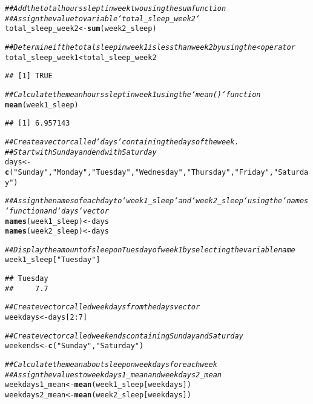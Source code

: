 \documentclass{article}\usepackage[]{graphicx}\usepackage[]{xcolor}
\makeatletter
\newcommand{\hlnum}[1]{\textcolor[rgb]{0.686,0.059,0.569}{#1}}%
\newcommand{\hlstr}[1]{\textcolor[rgb]{0.192,0.494,0.8}{#1}}%
\newcommand{\hlcom}[1]{\textcolor[rgb]{0.678,0.584,0.686}{\textit{#1}}}%
\newcommand{\hlopt}[1]{\textcolor[rgb]{0,0,0}{#1}}%
\newcommand{\hlstd}[1]{\textcolor[rgb]{0.345,0.345,0.345}{#1}}%
\newcommand{\hlkwb}[1]{\textcolor[rgb]{0.69,0.353,0.396}{#1}}%
\newcommand{\hlkwd}[1]{\textcolor[rgb]{0.737,0.353,0.396}{\textbf{#1}}}%
\newenvironment{kframe}{%
 \def\at@end@of@kframe{}%
 \ifinner\ifhmode%
  \def\at@end@of@kframe{\end{minipage}}%
  \begin{minipage}{\columnwidth}%
 \fi\fi%
 \def\FrameCommand##1{\hskip\@totalleftmargin \hskip-\fboxsep
 \colorbox{shadecolor}{##1}\hskip-\fboxsep
     \hskip-\linewidth \hskip-\@totalleftmargin \hskip\columnwidth}%
 \MakeFramed {\advance\hsize-\width
   \@totalleftmargin\z@ \linewidth\hsize
   \@setminipage}}%
 {\par\unskip\endMakeFramed%
 \at@end@of@kframe}
\newenvironment{knitrout}{}{} %
\makeatother
\begin{document}
\begin{knitrout}
\begin{kframe}
\begin{alltt}
\hlcom{## Add the total hours slept in week two using the sum function}
\hlcom{## Assign the value to variable `total_sleep_week2`}
\hlstd{total_sleep_week2} \hlkwb{<-} \hlkwd{sum}\hlstd{(week2_sleep)}

\hlcom{## Determine if the total sleep in week 1 is less than week 2 by using the < operator}
\hlstd{total_sleep_week1} \hlopt{<} \hlstd{total_sleep_week2}
\end{alltt}
\begin{verbatim}
## [1] TRUE
\end{verbatim}
\begin{alltt}
\hlcom{## Calculate the mean hours slept in week 1 using the `mean()` function}
\hlkwd{mean}\hlstd{(week1_sleep)}
\end{alltt}
\begin{verbatim}
## [1] 6.957143
\end{verbatim}
\begin{alltt}
\hlcom{## Create a vector called `days` containing the days of the week.}
\hlcom{## Start with Sunday and end with Saturday}
\hlstd{days} \hlkwb{<-} \hlkwd{c}\hlstd{(}\hlstr{"Sunday"}\hlstd{,} \hlstr{"Monday"}\hlstd{,} \hlstr{"Tuesday"}\hlstd{,} \hlstr{"Wednesday"}\hlstd{,} \hlstr{"Thursday"}\hlstd{,} \hlstr{"Friday"}\hlstd{,} \hlstr{"Saturday"}\hlstd{)}

\hlcom{## Assign the names of each day to `week1_sleep` and `week2_sleep` using the `names` function and `days` vector}
\hlkwd{names}\hlstd{(week1_sleep)} \hlkwb{<-} \hlstd{days}
\hlkwd{names}\hlstd{(week2_sleep)} \hlkwb{<-} \hlstd{days}

\hlcom{## Display the amount of sleep on Tuesday of week 1 by selecting the variable name}
\hlstd{week1_sleep[}\hlstr{"Tuesday"}\hlstd{]}
\end{alltt}
\begin{verbatim}
## Tuesday 
##     7.7
\end{verbatim}
\begin{alltt}
\hlcom{## Create vector called weekdays from the days vector}
\hlstd{weekdays} \hlkwb{<-} \hlstd{days[}\hlnum{2}\hlopt{:}\hlnum{7}\hlstd{]}

\hlcom{## Create vector called weekends containing Sunday and Saturday}
\hlstd{weekends} \hlkwb{<-} \hlkwd{c}\hlstd{(}\hlstr{"Sunday"}\hlstd{,} \hlstr{"Saturday"}\hlstd{)}

\hlcom{## Calculate the mean about sleep on weekdays for each week}
\hlcom{## Assign the values to weekdays1_mean and weekdays2_mean}
\hlstd{weekdays1_mean} \hlkwb{<-} \hlkwd{mean}\hlstd{(week1_sleep[weekdays])}
\hlstd{weekdays2_mean} \hlkwb{<-} \hlkwd{mean}\hlstd{(week2_sleep[weekdays])}


\end{alltt}
\end{kframe}
\end{knitrout}
\end{document}
